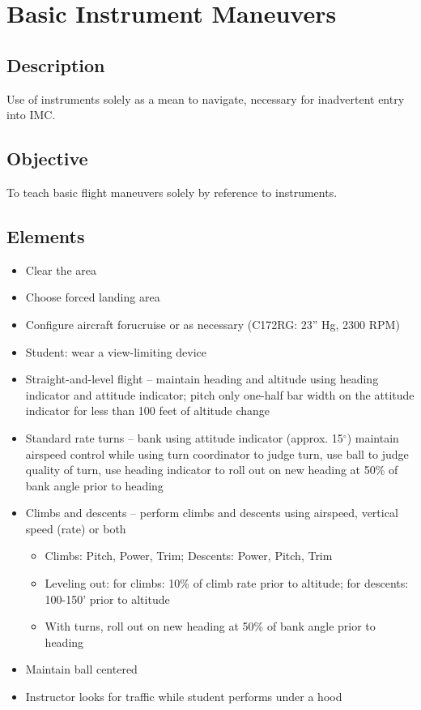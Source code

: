 \section{Basic Instrument Maneuvers}

\subsection{Description}

Use of instruments solely as a mean to navigate,
necessary for inadvertent entry into IMC.

\subsection{Objective}

To teach basic flight maneuvers solely by reference to
instruments.

\subsection{Elements}

\begin{itemize}
  \item Clear the area
  \item Choose forced landing area
  \item Configure aircraft forucruise or as necessary (C172RG: 23'' Hg, 2300
    RPM)
  \item Student: wear a view-limiting device
  \item Straight-and-level flight -- maintain heading and altitude using heading
indicator and attitude indicator; pitch only one-half bar width on the attitude
indicator for less than 100 feet of altitude change
  \item Standard rate turns -- bank using attitude indicator (approx.
    15$^\circ$) maintain airspeed control while using turn coordinator to judge
    turn, use ball to judge quality of turn, use heading indicator to roll out
    on new heading at 50\% of bank angle prior to heading
  \item Climbs and descents -- perform climbs and descents using airspeed,
    vertical speed (rate) or both
    \begin{itemize}
      \item Climbs: Pitch, Power, Trim; Descents: Power, Pitch, Trim
      \item Leveling out: for climbs: 10\% of climb rate prior to altitude; for
        descents: 100-150' prior to altitude
      \item With turns, roll out on new heading at 50\% of bank angle prior to
        heading
    \end{itemize}
  \item Maintain ball centered
  \item Instructor looks for traffic while student performs under a hood
\end{itemize}

